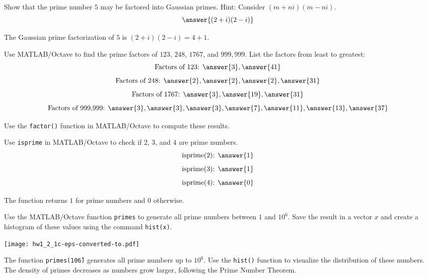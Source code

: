 \documentclass{ximera}
\author{Jont Allen}
\begin{document}
\begin{problem}
    Show that the prime number \(5\) may be factored into Gaussian primes. Hint: Consider \((m + ni)(m - ni)\).
    \[
    \answer{(2 + i)(2 - i)}
    \]
    \begin{feedback}[correct]
    The Gaussian prime factorization of \(5\) is \((2 + i)(2 - i) = 4 + 1\).
    \end{feedback}
\end{problem}

\begin{problem}
    Use MATLAB/Octave to find the prime factors of \(123\), \(248\), \(1767\), and \(999,999\). List the factors from least to greatest:
    \[
    \text{Factors of 123: } \answer{3}, \answer{41}
    \]
    \[
    \text{Factors of 248: } \answer{2}, \answer{2}, \answer{2}, \answer{31}
    \]
    \[
    \text{Factors of 1767: } \answer{3}, \answer{19}, \answer{31}
    \]
    \[
    \text{Factors of 999,999: } \answer{3}, \answer{3}, \answer{3}, \answer{7}, \answer{11}, \answer{13}, \answer{37}
    \]
    \begin{feedback}[correct]
    Use the \texttt{factor()} function in MATLAB/Octave to compute these results.
    \end{feedback}
\end{problem}

\begin{problem}
    Use \texttt{isprime} in MATLAB/Octave to check if \(2\), \(3\), and \(4\) are prime numbers.
    \[
    \text{isprime(2): } \answer{1}
    \]
    \[
    \text{isprime(3): } \answer{1}
    \]
    \[
    \text{isprime(4): } \answer{0}
    \]
    \begin{feedback}[correct]
    The function returns \(1\) for prime numbers and \(0\) otherwise.
    \end{feedback}
\end{problem}

\begin{problem}
    Use the MATLAB/Octave function \texttt{primes} to generate all prime numbers between \(1\) and \(10^6\).
    Save the result in a vector \(x\) and create a histogram of these values using the command \texttt{hist(x)}.
    \begin{multipleChoice}
    \end{multipleChoice}
    \begin{feedback}[correct]
    \begin{center}
        \texttt{[image: hw1\_2\_1c-eps-converted-to.pdf]}
    \end{center}
    The function \texttt{primes(10\^6)} generates all prime numbers up to \(10^6\). Use the \texttt{hist()} function to visualize the distribution of these numbers. The density of primes decreases as numbers grow larger, following the Prime Number Theorem.
    \end{feedback}
\end{problem}
\end{document}
